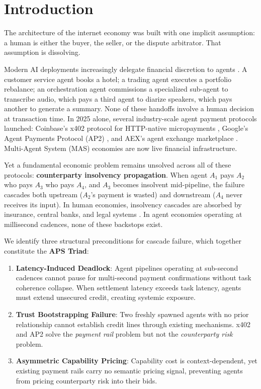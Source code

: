 \documentclass[11pt]{article}
\begin{document}
\section{Introduction}
The architecture of the internet economy was built with one implicit assumption: a human is either the buyer, the seller, or the dispute arbitrator. That assumption is dissolving. 

Modern AI deployments increasingly delegate financial discretion to agents \cite{agentic_economy_2025}. A customer service agent books a hotel; a trading agent executes a portfolio rebalance; an orchestration agent commissions a specialized sub-agent to transcribe audio, which pays a third agent to diarize speakers, which pays another to generate a summary. None of these handoffs involve a human decision at transaction time. In 2025 alone, several industry-scale agent payment protocols launched: Coinbase's x402 protocol for HTTP-native micropayments \cite{x402_2025}, Google's Agent Payments Protocol (AP2) \cite{ap2_2025}, and AEX's agent exchange marketplace \cite{aex_2025}. Multi-Agent System (MAS) economies are now live financial infrastructure.

Yet a fundamental economic problem remains unsolved across all of these protocols: \textbf{counterparty insolvency propagation}. When agent $A_1$ pays $A_2$ who pays $A_3$ who pays $A_4$, and $A_3$ becomes insolvent mid-pipeline, the failure cascades both upstream ($A_2$'s payment is wasted) and downstream ($A_4$ never receives its input). In human economies, insolvency cascades are absorbed by insurance, central banks, and legal systems \cite{brady1988}. In agent economies operating at millisecond cadences, none of these backstops exist.

We identify three structural preconditions for cascade failure, which together constitute the \textbf{APS Triad}:
\begin{enumerate}
    \item \textbf{Latency-Induced Deadlock}: Agent pipelines operating at sub-second cadences cannot pause for multi-second payment confirmations without task coherence collapse. When settlement latency exceeds task latency, agents must extend unsecured credit, creating systemic exposure.
    \item \textbf{Trust Bootstrapping Failure}: Two freshly spawned agents with no prior relationship cannot establish credit lines through existing mechanisms. x402 and AP2 solve the \textit{payment rail} problem but not the \textit{counterparty risk} problem.
    \item \textbf{Asymmetric Capability Pricing}: Capability cost is context-dependent, yet existing payment rails carry no semantic pricing signal, preventing agents from pricing counterparty risk into their bids.
\end{enumerate}
\end{document}

